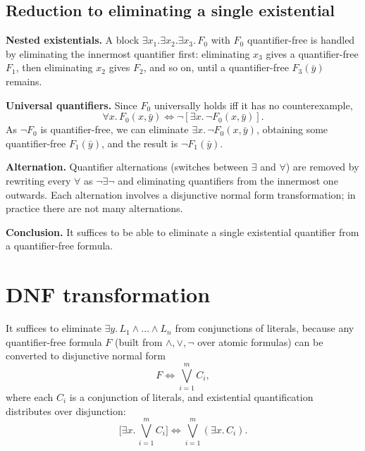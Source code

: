 \subsection*{Reduction to eliminating a single existential}
 
\textbf{Nested existentials.} A block $\exists x_1.\exists x_2.\exists x_3.\, F_0$ with $F_0$ quantifier-free is handled by eliminating the innermost quantifier first: eliminating $x_3$ gives a quantifier-free $F_1$, then eliminating $x_2$ gives $F_2$, and so on, until a quantifier-free $F_3(\bar y)$ remains.
 
\textbf{Universal quantifiers.} Since $F_0$ universally holds iff it has no counterexample,
\[
\forall x.\, F_0(x, \bar y) \iff \neg[\exists x.\, \neg F_0(x, \bar y)].
\]
As $\neg F_0$ is quantifier-free, we can eliminate $\exists x.\, \neg F_0(x,\bar y)$, obtaining some quantifier-free $F_1(\bar y)$, and the result is $\neg F_1(\bar y)$.
 
\textbf{Alternation.} Quantifier alternations (switches between $\exists$ and $\forall$) are removed by rewriting every $\forall$ as $\neg\exists\neg$ and eliminating quantifiers from the innermost one outwards. Each alternation involves a disjunctive normal form transformation; in practice there are not many alternations.
 
\medskip
\noindent\textbf{Conclusion.} It suffices to be able to eliminate a single existential quantifier from a quantifier-free formula.
 
\section{DNF transformation}
 
 
It suffices to eliminate $\exists y.\, L_1 \wedge \ldots \wedge L_n$ from conjunctions of literals, because any quantifier-free formula $F$ (built from $\wedge, \vee, \neg$ over atomic formulas) can be converted to disjunctive normal form
\[
F \iff \bigvee_{i=1}^{m} C_i,
\]
where each $C_i$ is a conjunction of literals, and existential quantification distributes over disjunction:
\[
\Big[\exists x.\, \bigvee_{i=1}^{m} C_i\Big] \iff \bigvee_{i=1}^{m} (\exists x.\, C_i).
\]
 
